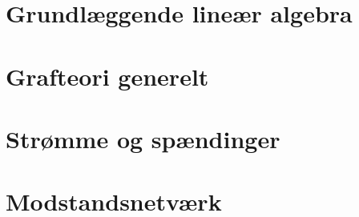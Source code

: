 \documentclass[a4paper,11pt]{article} %
\begin{document}

\newpage

\tableofcontents

\newpage

\section{Grundlæggende lineær algebra}

\newpage

\section{Grafteori generelt}

\newpage

\section{Strømme og spændinger}

\newpage

\section{Modstandsnetværk}

\newpage
\end{document}
